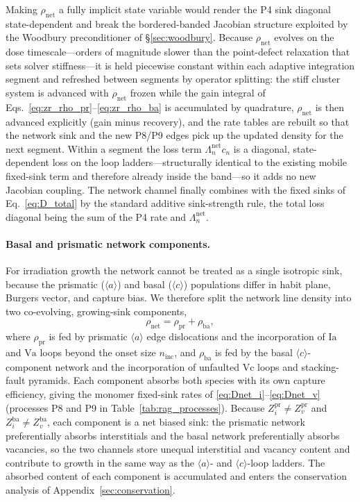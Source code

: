 Making $\rho_{\mathrm{net}}$ a fully implicit state variable would render
the P4 sink diagonal state-dependent and break the bordered-banded
Jacobian structure exploited by the Woodbury preconditioner of
\S\ref{sec:woodbury}. Because $\rho_{\mathrm{net}}$ evolves on the dose
timescale---orders of magnitude slower than the point-defect relaxation
that sets solver stiffness---it is held piecewise constant within each
adaptive integration segment and refreshed between segments by operator
splitting: the stiff cluster system is advanced with $\rho_{\mathrm{net}}$
frozen while the gain integral of Eqs.~\eqref{eq:zr_rho_pr}--\eqref{eq:zr_rho_ba} is accumulated
by quadrature, $\rho_{\mathrm{net}}$ is then advanced explicitly (gain
minus recovery), and the rate tables are rebuilt so that the network sink
and the new P8/P9 edges pick up the updated density for the next segment.
Within a segment the loss term $\Lambda_n^{\mathrm{net}}c_n$ is a diagonal,
state-dependent loss on the loop ladders---structurally identical to the
existing mobile fixed-sink term and therefore already inside the band---so
it adds no new Jacobian coupling. The network channel finally combines with
the fixed sinks of Eq.~\eqref{eq:D_total} by the standard additive
sink-strength rule, the total loss diagonal being the sum of the P4 rate
and $\Lambda_n^{\mathrm{net}}$.

\paragraph{Basal and prismatic network components.}
For irradiation growth the network cannot be treated as a single isotropic sink, because the prismatic ($\langle a\rangle$) and basal ($\langle c\rangle$) populations differ in habit plane, Burgers vector, and capture bias. We therefore split the network line density into two co-evolving, growing-sink components,
\begin{equation}
  \rho_{\mathrm{net}} = \rho_{\mathrm{pr}} + \rho_{\mathrm{ba}},
  \label{eq:rho_split}
\end{equation}
where $\rho_{\mathrm{pr}}$ is fed by prismatic $\langle a\rangle$ edge dislocations and the incorporation of $\mathrm{Ia}$ and $\mathrm{Va}$ loops beyond the onset size $n_{\mathrm{inc}}$, and $\rho_{\mathrm{ba}}$ is fed by the basal $\langle c\rangle$-component network and the incorporation of unfaulted $\mathrm{Vc}$ loops and stacking-fault pyramids. Each component absorbs both species with its own capture efficiency, giving the monomer fixed-sink rates of \eqref{eq:Dnet_i}--\eqref{eq:Dnet_v} (processes P8 and P9 in Table~\ref{tab:rag_processes}). Because $Z_i^{\mathrm{pr}}\neq Z_v^{\mathrm{pr}}$ and $Z_i^{\mathrm{ba}}\neq Z_v^{\mathrm{ba}}$, each component is a net biased sink: the prismatic network preferentially absorbs interstitials and the basal network preferentially absorbs vacancies, so the two channels store unequal interstitial and vacancy content and contribute to growth in the same way as the $\langle a\rangle$- and $\langle c\rangle$-loop ladders. The absorbed content of each component is accumulated and enters the conservation analysis of Appendix~\ref{sec:conservation}.


